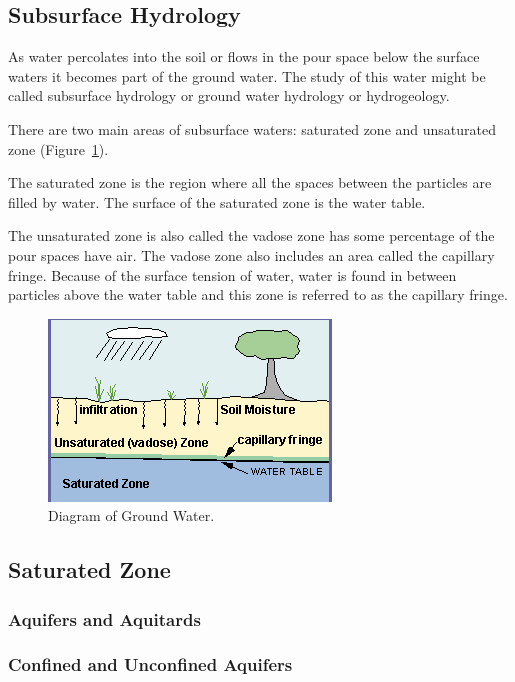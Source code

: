 \documentclass{book}\usepackage{knitr}
\begin{document}
\begin{knitrout}
\begin{kframe}
\subsection{Subsurface Hydrology}

As water percolates into the soil or flows in the pour space below the surface waters it becomes part of the ground water. The study of this water might be called subsurface hydrology or ground water hydrology or hydrogeology. 

There are two main areas of subsurface waters: saturated zone and unsaturated zone (Figure~\ref{fig:groundwater}).

The saturated zone is the region where all the spaces between the particles are filled by water. The surface of the saturated zone is the water table. 

The unsaturated zone is also called the vadose zone has some percentage of the pour spaces have air. The vadose zone also includes an area called the capillary fringe. Because of the surface tension of water, water is found in between particles above the water table and this zone is referred to as the capillary fringe. 

\begin{figure}
\includegraphics{images/critical-zone/groundwater}
\caption{Diagram of Ground Water. }
\label{fig:groundwater}
\end{figure}

\subsection{Saturated Zone}

\subsubsection{Aquifers and Aquitards}

\subsubsection{Confined and Unconfined Aquifers}


\end{kframe}
\end{knitrout}
\end{document}
